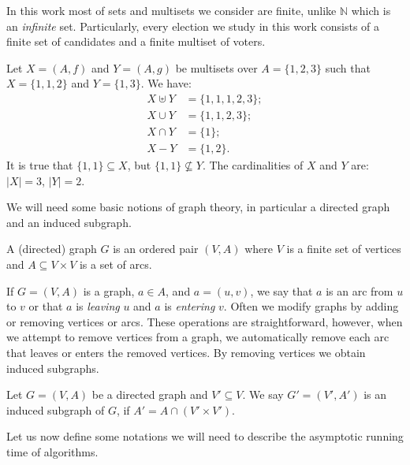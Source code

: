 In this work most of sets and multisets we consider are finite, unlike $\mathbb{N}$ which is an \emph{infinite} set.
Particularly, every election we study in this work consists of a finite set of candidates and a finite multiset of voters.

\begin{Example}
    Let $X=(A,f)$ and $Y=(A,g)$ be multisets over $A=\{1,2,3\}$ such that $X=\{1,1,2\}$ and $Y=\{1,3\}$.
	We have:
	\begin{align*}
	    X\uplus Y &= \{1,1,1,2,3\}; \\
		X\cup Y &= \{1,1,2,3\}; \\
		X\cap Y &= \{1\}; \\
		X-Y &= \{1,2\}.
	\end{align*}
	It is true that $\{1,1\}\subseteq X$, but $\{1,1\}\not\subseteq Y$.
	The cardinalities of $X$ and $Y$ are: $|X|=3$, $|Y|=2$.
\end{Example}

We will need some basic notions of graph theory, in particular a directed graph and an induced subgraph.

\begin{definition}
	A (directed) graph $G$ is an ordered pair $(V,A)$ where $V$ is a finite set of vertices and $A\subseteq V\times V$ is a set of arcs.
\end{definition}

If $G=(V,A)$ is a graph, $a\in A$, and $a=(u,v)$, we say that $a$ is an arc from $u$ to $v$ or that $a$ is \emph{leaving} $u$ and $a$ is \emph{entering} $v$.
Often we modify graphs by adding or removing vertices or arcs.
These operations are straightforward, however, when we attempt to remove vertices from a graph, we automatically remove each arc that leaves or enters the removed vertices.
By removing vertices we obtain induced subgraphs.

\begin{definition}
    Let $G=(V,A)$ be a directed graph and $V'\subseteq V$.
	We say $G'=(V',A')$ is an induced subgraph of $G$, if $A'=A\cap(V'\!\times V')$.
\end{definition}

Let us now define some notations we will need to describe the asymptotic running time of algorithms.

